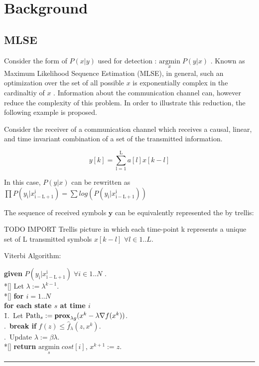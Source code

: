 \documentclass[12pt,a4paper]{report}
\begin{document}
\section{Background}

\subsection{MLSE}
Consider the form of $P(x|y)$ used for detection :
$\underset{x}{\text{argmin}} \; P(y|x) $ . Known as Maximum Likelihood Sequence Estimation (MLSE), in general, such an optimization over the set of all possible $x$ is exponentially complex in the cardinaltiy of $x$ . Information about the communication channel can, however reduce the complexity of this problem. In order to illustrate this reduction, the following example is proposed.
\par
Consider the receiver of a communication channel which receives a causal, linear, and time invariant combination of a set of the transmitted information. 

\begin{equation}
y[k] = \sum_{\mathrm{l=1}}^{\mathrm{L}} a[l]x[k-l]
\end{equation}

In this case, $P(y|x)$ can be rewritten as
$\prod P(y_{\mathrm{i}}|x_{\mathrm{i-L+1}}^{\mathrm{i}}) = \sum
log(P(y_{\mathrm{i}}|x_{\mathrm{i-L+1}}^{\mathrm{i}}) )$

The sequence of received symbols $\mathbf{y}$ can be equivalently represented the by trellis:

TODO IMPORT Trellis picture
in which each time-point k represents a unique set of L transmitted symbols 
$x[k-l]$ $ \forall l \in {1..L}$. 



Viterbi Algorithm:

    {\footnotesize
    \begin{tabbing}
        {\bf given} $P(y_{\mathrm{i}}|x_{\mathrm{i-L+1}}^{\mathrm{i}}) \; \forall i \in {1..N}$ . \\*[\smallskipamount]
        Let $\lambda := \lambda^{k-1}$. \\*[\smallskipamount]
        {\bf for $i = 1..N $} \\
         \qquad \= {\bf for each state $s$ at time $i$}\\
        \qquad \qquad \= 1.\ Let $\mathrm{Path}_{s} := \mathbf{prox}_{\lambda g}(x^{k} - \lambda \nabla f(x^{k}))$. \\
        .\ {\bf break if} $f(z) \leq \hat{f}_{\lambda}(z, x^{k})$. \\
        .\ Update $\lambda := \beta \lambda$. \\*[\smallskipamount]
        {\bf return} $\underset{s}{\text{argmin}} \; cost[i] $, $x^{k+1}:=z$.
    \end{tabbing}}
    \noindent\rule[10pt]{\textwidth}{0.4pt}
\end{document}
